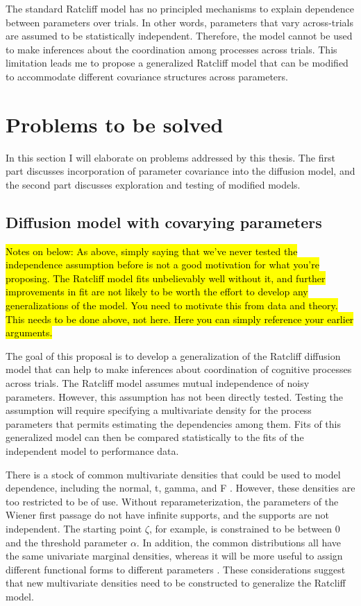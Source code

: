 \documentclass[12pt]{article}
\newcommand{\trish}[1]{\textrm{\hl{#1}}}
\begin{document}
The standard Ratcliff model has no principled mechanisms to explain dependence between parameters over trials.
In other words, parameters that vary across-trials are assumed to be statistically independent. Therefore, the model cannot be used to make inferences about the coordination among processes
across trials. This limitation leads me to propose a generalized
Ratcliff model that can be modified to accommodate different covariance
structures across parameters.

\section{Problems to be solved}

In this section I will elaborate on problems addressed by this thesis. The first part discusses incorporation of parameter covariance into the diffusion model, and the second part discusses exploration and testing of modified models.

\subsection{Diffusion model with covarying parameters}

\trish{Notes on below: As above, simply saying that we've never tested the
independence assumption before is not a good motivation for what you're
proposing.  The Ratcliff model fits unbelievably well without it, and further
improvements in fit are not likely to be worth the effort to develop any
generalizations of the model.  You need to motivate this from data and theory.  This
needs to be done above, not here.  Here you can simply reference your
earlier arguments.}

The goal of this proposal is to develop a generalization of
the Ratcliff diffusion model that can help to make inferences about
coordination of cognitive processes across trials. The Ratcliff model
assumes mutual independence of noisy parameters. However, this
assumption has not been directly tested. Testing the assumption
will require specifying a multivariate density for the process
parameters that permits estimating the dependencies among them.
Fits of this generalized model can then be compared statistically
to the fits of the independent model to performance data.
    
There is a stock of common multivariate densities that could be used
to model dependence, including the normal, t, gamma, and F
\citep{KotBal2004}. However, these densities are too restricted to
be of use. Without
reparameterization, the parameters of the Wiener first passage do not have
infinite supports, and the supports are not independent.  The starting
point $\zeta$, for example, is constrained to be between 0 and the
threshold parameter $\alpha$.
In addition, the common distributions all have the same univariate
marginal densities, whereas it will be more useful to assign
different functional forms to different parameters
\citep{Rat2013}. These considerations suggest that new multivariate
densities need to be constructed to generalize the Ratcliff model.
\end{document}
